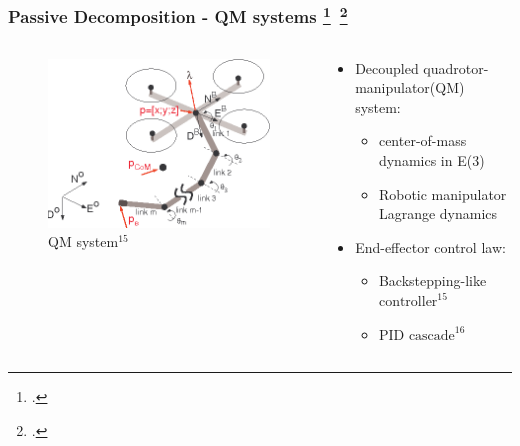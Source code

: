 \begin{frame}
	\frametitle{Passive Decomposition - QM systems \footcite{passive-decomp-quadrotor-with-robotic-manip}$\,$  \footcite{decoupled-aerial-manipulation}}
	
	\begin{columns}
		\begin{column}{0.5\textwidth}\centering
			\begin{figure}[H]
				\includegraphics[width=0.9\columnwidth]{figures/aerial_manip.png}	
				\centering
				\caption{QM system${}^{15}$}
				\label{fig:aerial_manip}
			\end{figure}
		\end{column}
		
		\begin{column}{0.5\textwidth}\centering
			\begin{itemize}
			\item Decoupled quadrotor-manipulator(QM) system:
			\begin{itemize}
				\item center-of-mass dynamics in E(3)
				\item Robotic manipulator Lagrange dynamics
			\end{itemize}
			\item End-effector control law:
			\begin{itemize}
				\item Backstepping-like $\text{controller}^{15}$
				\item PID $\text{cascade}^{16}$
			\end{itemize}
			\end{itemize}
		\end{column}
	\end{columns}
 \end{frame}

